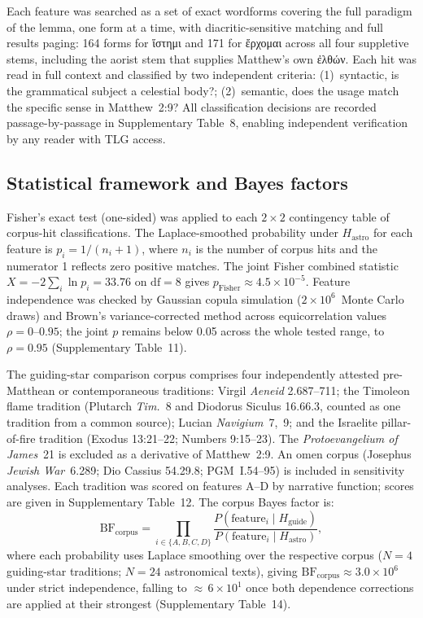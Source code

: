 \documentclass[sn-nature]{sn-jnl}
\newcommand{\grk}[1]{{\fontencoding{LGR}\selectfont #1}}
\newcommand{\grk}[1]{{\greekfont #1}}
\begin{document}
Each feature was searched as a set of exact wordforms covering the full
paradigm of the lemma, one form at a time, with diacritic-sensitive matching
and full results paging: 164 forms for \grk{ἵστημι} and 171 for
\grk{ἔρχομαι} across all four suppletive stems, including the aorist stem that
supplies Matthew's own \grk{ἐλθών}.
Each hit was read in full context and classified by two
independent criteria: (1)~syntactic, is the grammatical subject a celestial
body?; (2)~semantic, does the usage match the specific sense in Matthew~2:9?
All classification decisions are recorded passage-by-passage in
Supplementary Table~8, enabling independent verification by any reader
with TLG access.

\subsection{Statistical framework and Bayes factors}
\label{subsec:stats_methods}

Fisher's exact test (one-sided) was applied to each $2\times2$ contingency
table of corpus-hit classifications. The Laplace-smoothed probability under
$H_\text{astro}$ for each feature is $p_i = 1/(n_i+1)$, where $n_i$ is the
number of corpus hits and the numerator 1 reflects zero positive matches.
The joint Fisher combined statistic $X=-2\sum_i\ln p_i = 33.76$ on
$\mathrm{df}=8$ gives $p_\text{Fisher}\approx4.5\times10^{-5}$. Feature
independence was checked by Gaussian copula simulation ($2\times10^6$~Monte
Carlo draws) and Brown's variance-corrected method across equicorrelation
values $\rho=0$--$0.95$; the joint $p$ remains below 0.05 across the whole tested range, to $\rho=0.95$ (Supplementary Table~11).

The guiding-star comparison corpus comprises four independently attested
pre-Matthean or contemporaneous traditions: Virgil \textit{Aeneid}
2.687--711; the Timoleon flame tradition (Plutarch \textit{Tim.}~8 and
Diodorus Siculus 16.66.3, counted as one tradition from a common source);
Lucian \textit{Navigium}~7,~9; and the Israelite pillar-of-fire tradition
(Exodus 13:21--22; Numbers 9:15--23). The \textit{Protoevangelium of James}~21 is excluded as a
derivative of Matthew~2:9. An omen corpus (Josephus \textit{Jewish
War}~6.289; Dio Cassius 54.29.8; PGM~I.54--95) is included in sensitivity
analyses. Each tradition was scored on features A--D by narrative function;
scores are given in Supplementary Table~12. The corpus Bayes factor is:
\begin{equation}
  \mathrm{BF}_\text{corpus}
    = \prod_{i\in\{A,B,C,D\}}
      \frac{P(\text{feature}_i \mid H_\text{guide})}
           {P(\text{feature}_i \mid H_\text{astro})},
\end{equation}
where each probability uses Laplace smoothing over the respective corpus
($N=4$ guiding-star traditions; $N=24$ astronomical texts), giving
$\mathrm{BF}_\text{corpus}\approx3.0\times10^{6}$ under strict independence,
falling to ${\approx}\,6\times10^{1}$ once both dependence corrections are
applied at their strongest (Supplementary Table~14).
\end{document}
